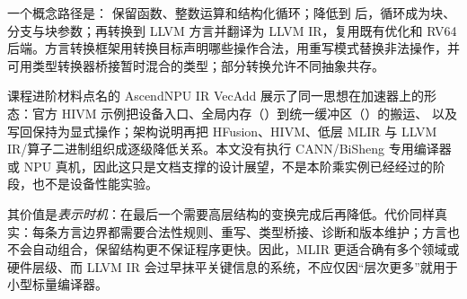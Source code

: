 一个概念路径是： 保留函数、整数运算和结构化循环；降低到  后，循环成为块、分支与块参数；再转换到 LLVM 方言并翻译为 LLVM IR，复用既有优化和 RV64 后端。方言转换框架用转换目标声明哪些操作合法，用重写模式替换非法操作，并可用类型转换器桥接暂时混合的类型；部分转换允许不同抽象共存\cite{mlir-dialect-conversion-2026,mlir-llvm-target-2026,mlir-toy-lowering-2026}。

\begin{center}
\small
{}
\end{center}

课程进阶材料点名的 AscendNPU IR VecAdd 展示了同一思想在加速器上的形态：官方 HIVM 示例把设备入口、全局内存（）到统一缓冲区（）的搬运、 以及写回保持为显式操作；架构说明再把 HFusion、HIVM、低层 MLIR 与 LLVM IR/算子二进制组织成逐级降低关系\cite{ascend-vecadd-2026,ascend-architecture-2026}。本文没有执行 CANN/BiSheng 专用编译器或 NPU 真机，因此这只是文档支撑的设计展望，不是本阶乘实例已经经过的阶段，也不是设备性能实验。

其价值是\emph{表示时机}：在最后一个需要高层结构的变换完成后再降低。代价同样真实：每条方言边界都需要合法性规则、重写、类型桥接、诊断和版本维护；方言也不会自动组合，保留结构更不保证程序更快。因此，MLIR 更适合确有多个领域或硬件层级、而 LLVM IR 会过早抹平关键信息的系统，不应仅因“层次更多”就用于小型标量编译器。
